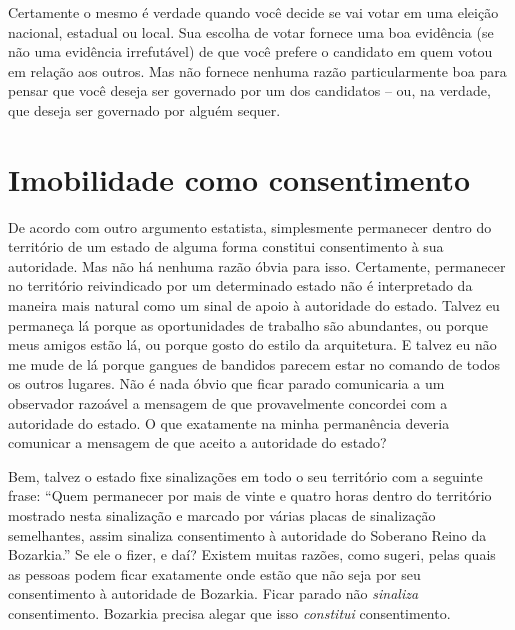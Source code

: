 Certamente o mesmo é verdade quando você decide se vai votar em uma eleição nacional, estadual ou local. Sua escolha de votar fornece uma boa evidência (se não uma evidência irrefutável) de que você prefere o candidato em quem votou em relação aos outros. Mas não fornece nenhuma razão particularmente boa para pensar que você deseja ser governado por um dos candidatos -- ou, na verdade, que deseja ser governado por alguém sequer.

\section{Imobilidade como consentimento}

De acordo com outro argumento estatista, simplesmente permanecer dentro do território de um estado de alguma forma constitui consentimento à sua autoridade. Mas não há nenhuma razão óbvia para isso. Certamente, permanecer no território reivindicado por um determinado estado não é interpretado da maneira mais natural como um sinal de apoio à autoridade do estado. Talvez eu permaneça lá porque as oportunidades de trabalho são abundantes, ou porque meus amigos estão lá, ou porque gosto do estilo da arquitetura. E talvez eu não me mude de lá porque gangues de bandidos parecem estar no comando de todos os outros lugares. Não é nada óbvio que ficar parado comunicaria a um observador razoável a mensagem de que provavelmente concordei com a autoridade do estado. O que exatamente na minha permanência deveria comunicar a mensagem de que aceito a autoridade do estado?

Bem, talvez o estado fixe sinalizações em todo o seu território com a seguinte frase: ``Quem permanecer por mais de vinte e quatro horas dentro do território mostrado nesta sinalização e marcado por várias placas de sinalização semelhantes, assim sinaliza consentimento à autoridade do Soberano Reino da Bozarkia.'' Se ele o fizer, e daí? Existem muitas razões, como sugeri, pelas quais as pessoas podem ficar exatamente onde estão que não seja por seu consentimento à autoridade de Bozarkia. Ficar parado não \emph{sinaliza} consentimento. Bozarkia precisa alegar que isso \emph{constitui} consentimento.

